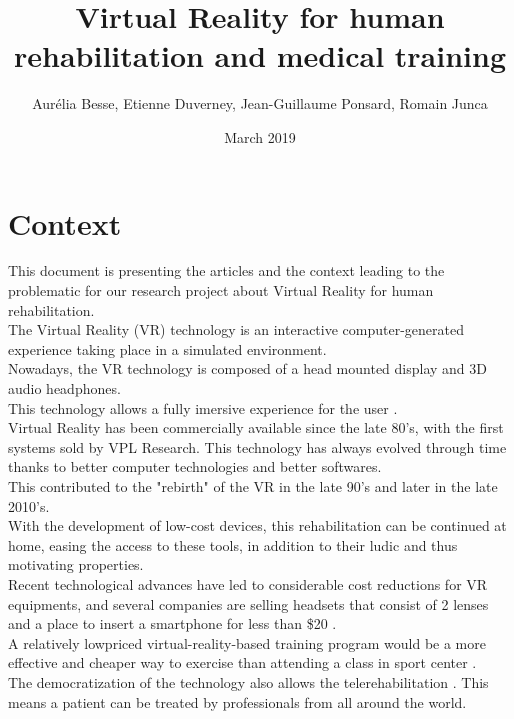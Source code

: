 \documentclass[12pt, openany, twocolumn]{article}
\title{Virtual Reality for human rehabilitation and medical training}
\author{ Aurélia Besse, Etienne Duverney, Jean-Guillaume Ponsard, Romain Junca }
\date{March 2019}
\begin{document}
\maketitle

\section{Context} 
\hspace{0.5cm} 
This document is presenting the articles and the context leading to the problematic for our research project about Virtual Reality for human rehabilitation.
\\

The Virtual Reality (VR) technology is an interactive computer-generated experience taking place in a simulated environment. 
\\
Nowadays, the VR technology is composed of a head mounted display and 3D audio headphones.
\\
This technology allows a fully imersive experience for the user \cite{sveistrupMotorRehabilitationUsing2004}.
\\

Virtual Reality has been commercially available since the late 80's, with the first systems sold by VPL Research.
This technology has always evolved through time thanks to better computer technologies and better softwares.
\\
This contributed to the "rebirth" of the VR in the late 90's \cite{burdeaVirtualRehabilitationBenefits2003} and later in the late 2010's.
\\


With the development of low-cost devices, this rehabilitation can be continued at home, easing the access to these tools, in addition to their ludic and thus motivating properties.
\\ Recent technological advances have led to considerable cost reductions for VR equipments, and several companies are selling headsets that consist of 2 lenses and a place to insert a smartphone for less than \$20 \cite{araneVirtualRealityPain2017}.
\\ A relatively lowpriced virtual-reality-based training program would be a more effective and cheaper way to exercise than attending a class in sport center \cite{kimEffectsVRbasedWii2014}.
\\ The democratization of the technology also allows the telerehabilitation \cite{burdeaVirtualRehabilitationBenefits2003}. This means a patient can be treated by professionals from all around the world. 
\\
\end{document}
